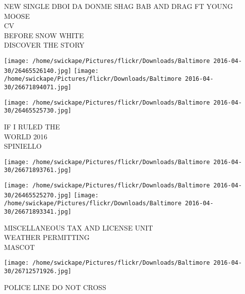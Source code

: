 \documentclass[10pt,letterpaper]{article}
\begin{document}
NEW SINGLE DBOI DA DONME SHAG BAB AND DRAG FT YOUNG MOOSE\\
CV\\
BEFORE SNOW WHITE\\
DISCOVER THE STORY\\
\pagebreak

\texttt{[image: /home/swickape/Pictures/flickr/Downloads/Baltimore 2016-04-30/26465526140.jpg]}
\texttt{[image: /home/swickape/Pictures/flickr/Downloads/Baltimore 2016-04-30/26671894071.jpg]}

\texttt{[image: /home/swickape/Pictures/flickr/Downloads/Baltimore 2016-04-30/26465525730.jpg]}

IF I RULED THE\\
WORLD 2016\\
SPINIELLO\\
\pagebreak

\texttt{[image: /home/swickape/Pictures/flickr/Downloads/Baltimore 2016-04-30/26671893761.jpg]}

\vspace{0.25in}
\texttt{[image: /home/swickape/Pictures/flickr/Downloads/Baltimore 2016-04-30/26465525270.jpg]}
\texttt{[image: /home/swickape/Pictures/flickr/Downloads/Baltimore 2016-04-30/26671893341.jpg]}

MISCELLANEOUS TAX AND LICENSE UNIT\\
WEATHER PERMITTING\\
MASCOT\\
\pagebreak

\texttt{[image: /home/swickape/Pictures/flickr/Downloads/Baltimore 2016-04-30/26712571926.jpg]}

POLICE LINE DO NOT CROSS\\
\pagebreak
\end{document}
